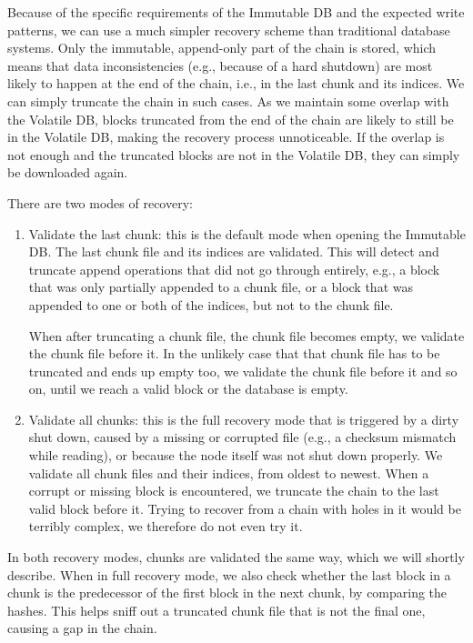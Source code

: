 Because of the specific requirements of the Immutable DB and the expected write
patterns, we can use a much simpler recovery scheme than traditional database
systems. Only the immutable, append-only part of the chain is stored, which
means that data inconsistencies (e.g., because of a hard shutdown) are most
likely to happen at the end of the chain, i.e., in the last chunk and its
indices. We can simply truncate the chain in such cases. As we maintain some
overlap with the Volatile DB, blocks truncated from the end of the
chain are likely to still be in the Volatile DB, making the recovery process
unnoticeable. If the overlap is not enough and the truncated blocks are not in
the Volatile DB, they can simply be downloaded again.

There are two modes of recovery:
\begin{enumerate}
\item Validate the last chunk: this is the default mode when opening the
  Immutable DB. The last chunk file and its indices are validated. This will
  detect and truncate append operations that did not go through entirely, e.g.,
  a block that was only partially appended to a chunk file, or a block that was
  appended to one or both of the indices, but not to the chunk file.

  When after truncating a chunk file, the chunk file becomes empty, we validate
  the chunk file before it. In the unlikely case that that chunk file has to be
  truncated and ends up empty too, we validate the chunk file before it and so
  on, until we reach a valid block or the database is empty.

\item Validate all chunks: this is the full recovery mode that is triggered by a
  dirty shut down, caused by a missing or corrupted file (e.g., a checksum
  mismatch while reading), or because the node itself was not shut down
  properly. We
  validate all chunk files and their indices, from oldest to newest. When a
  corrupt or missing block is encountered, we truncate the chain to the last
  valid block before it. Trying to recover from a chain with holes in it would
  be terribly complex, we therefore do not even try it.

\end{enumerate}
In both recovery modes, chunks are validated the same way, which we will shortly
describe. When in full recovery mode, we also check whether the last block in a
chunk is the predecessor of the first block in the next chunk, by comparing the
hashes. This helps sniff out a truncated chunk file that is not the final one,
causing a gap in the chain.

